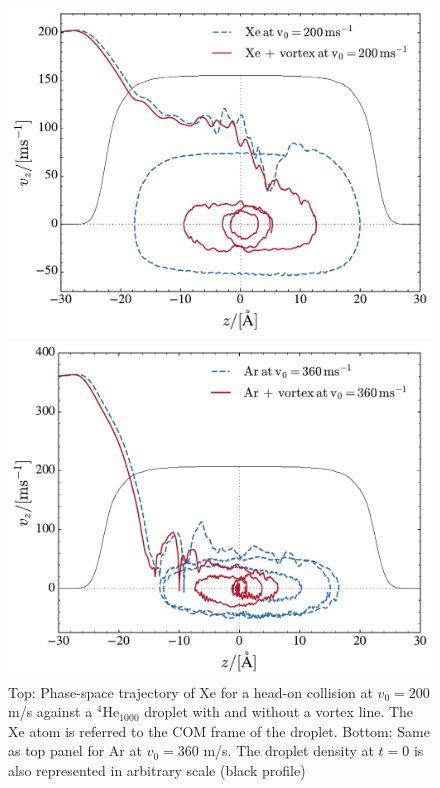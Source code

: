 \begin{figure}[!]
\centerline{\includegraphics[width=0.9\linewidth,clip]{phase-Xe-200-vortex}}
\centerline{\includegraphics[width=0.9\linewidth,clip]{phase-Ar-360-vortex}}
\caption{\label{fig3} 
Top: Phase-space trajectory  of Xe  for a  head-on collision at $v_0= 200$  m/s against a $^4$He$_{1000}$ droplet with and without a vortex line. 
The Xe atom is referred to the COM frame of the droplet.
Bottom: Same as top panel for Ar at $v_0=360$ m/s.
The droplet  density at $t=0$ is also represented in arbitrary scale (black profile) 
}
\end{figure}
%

